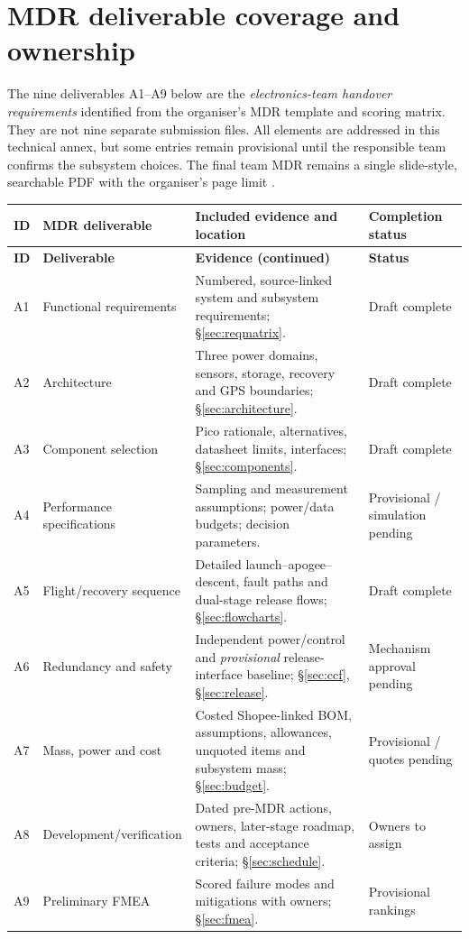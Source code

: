 
\section{MDR deliverable coverage and ownership}
\label{sec:mdrcoverage}
The nine deliverables A1--A9 below are the \emph{electronics-team handover requirements} identified from the organiser's MDR template and scoring matrix. They are not nine separate submission files. All elements are addressed in this technical annex, but some entries remain provisional until the responsible team confirms the subsystem choices. The final team MDR remains a single slide-style, searchable PDF with the organiser's page limit \cite{rtc2027app01,rtc2027app07}.

\small
\begingroup
{}
\begin{longtable}{@{}L{11mm}L{38mm}L{76mm}L{27mm}@{}}
\toprule{}\textbf{ID}&\textbf{MDR deliverable}&\textbf{Included evidence and location}&\textbf{Completion status}\\\midrule\endfirsthead
\toprule{}\textbf{ID}&\textbf{Deliverable}&\textbf{Evidence (continued)}&\textbf{Status}\\\midrule\endhead
\bottomrule\endlastfoot
A1 & Functional requirements & Numbered, source-linked system and subsystem requirements; \S\ref{sec:reqmatrix}. & Draft complete\\
A2 & Architecture & Three power domains, sensors, storage, recovery and GPS boundaries; \S\ref{sec:architecture}. & Draft complete\\
A3 & Component selection & Pico rationale, alternatives, datasheet limits, interfaces; \S\ref{sec:components}. & Draft complete\\
A4 & Performance specifications & Sampling and measurement assumptions; power/data budgets; decision parameters. & Provisional / simulation pending\\
A5 & Flight/recovery sequence & Detailed launch--apogee--descent, fault paths and dual-stage release flows; \S\ref{sec:flowcharts}. & Draft complete\\
A6 & Redundancy and safety & Independent power/control and \emph{provisional} release-interface baseline; \S\ref{sec:ccf}, \S\ref{sec:release}. & Mechanism approval pending\\
A7 & Mass, power and cost & Costed Shopee-linked BOM, assumptions, allowances, unquoted items and subsystem mass; \S\ref{sec:budget}. & Provisional / quotes pending\\
A8 & Development/verification & Dated pre-MDR actions, owners, later-stage roadmap, tests and acceptance criteria; \S\ref{sec:schedule}. & Owners to assign\\
A9 & Preliminary FMEA & Scored failure modes and mitigations with owners; \S\ref{sec:fmea}. & Provisional rankings\\
\end{longtable}
\endgroup %
\normalsize

